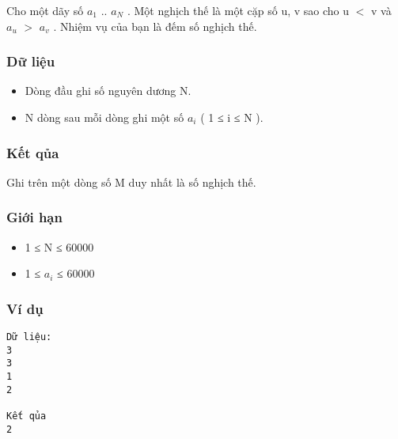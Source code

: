 



   Cho một dãy số $a_{1}$   .. $a_{N}$   . Một nghịch thế là một cặp số u, v sao cho u $<$ v và $a_{u}$   $>$ $a_{v}$   . Nhiệm vụ của bạn là đếm số nghịch thế.  

\subsubsection{   Dữ liệu  }
\begin{itemize}
	\item     Dòng đầu ghi số nguyên dương N.   
	\item     N dòng sau mỗi dòng ghi một số $a_{i}$    ( 1 ≤ i ≤ N ).   
\end{itemize}

\subsubsection{   Kết qủa  }

   Ghi trên một dòng số M duy nhất là số nghịch thế.  

\subsubsection{   Giới hạn  }
\begin{itemize}
	\item     1 ≤ N ≤ 60000   
	\item     1 ≤ $a_{i}$    ≤ 60000   
\end{itemize}

\subsubsection{   Ví dụ  }
\begin{verbatim}
Dữ liệu:
3
3
1
2

Kết qủa
2
\end{verbatim}
